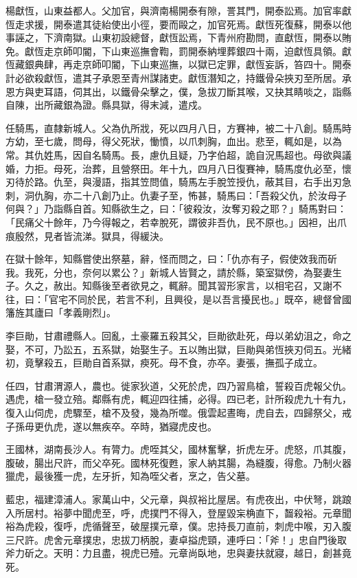 \begin{pinyinscope}
楊獻恆，山東益都人。父加官，與濟南楊開泰有隙，詈其門，開泰訟焉。加官率獻恆走求援，開泰遣其徒紿使出小徑，要而毆之，加官死焉。獻恆死復蘇，開泰以他事誣之，下濟南獄。山東初設總督，獻恆訟焉，下青州府勘問，直獻恆，開泰以賄免。獻恆走京師叩閽，下山東巡撫會鞫，罰開泰納埋葬銀四十兩，迫獻恆具領。獻恆藏銀典肆，再走京師叩閽，下山東巡撫，以獄已定罪，獻恆妄訴，笞四十。開泰計必欲殺獻恆，遣其子承恩至青州謀諸吏。獻恆潛知之，持鐵骨朵挾刃至所居。承恩方與吏耳語，伺其出，以鐵骨朵擊之，僕，急拔刀斷其喉，又抉其睛啖之，詣縣自陳，出所藏銀為證。縣具獄，得末減，遣戍。

任騎馬，直隸新城人。父為仇所戕，死以四月八日，方賽神，被二十八創。騎馬時方幼，至七歲，問母，得父死狀，慟憤，以爪刺胸，血出。悲至，輒如是，以為常。其仇姓馬，因自名騎馬。長，慮仇且疑，乃字伯超，詭自況馬超也。母欲與議婚，力拒。母死，治葬，且營祭田。年十九，四月八日復賽神，騎馬度仇必至，懷刃待於路。仇至，與漫語，指其笠問值，騎馬左手脫笠授仇，蔽其目，右手出刃急刺，洞仇胸，亦二十八創乃止。仇妻子至，怖甚，騎馬曰：「吾殺父仇，於汝母子何與？」乃詣縣自首。知縣欲生之，曰：「彼殺汝，汝奪刃殺之耶？」騎馬對曰：「民痛父十餘年，乃今得報之，若幸脫死，謂彼非吾仇，民不原也。」因袒，出爪痕殷然，見者皆流涕。獄具，得緩決。

在獄十餘年，知縣嘗使出祭墓，辭，怪而問之，曰：「仇亦有子，假使效我而斫我。我死，分也，奈何以累公？」新城人皆賢之，請於縣，築室獄傍，為娶妻生子。久之，赦出。知縣後至者欲見之，輒辭。聞其習形家言，以相宅召，又謝不往，曰：「官宅不同於民，若言不利，且興役，是以吾言擾民也。」既卒，總督曾國籓旌其廬曰「孝義剛烈」。

李巨勛，甘肅禮縣人。回亂，土豪羅五殺其父，巨勛欲赴死，母以弟幼沮之，命之娶，不可，乃訟五，五系獄，始娶生子。五以賄出獄，巨勛與弟恆挾刃伺五。光緒初，竟擊殺五，巨勛自首系獄，瘐死。母不食，亦卒。妻張，撫孤子成立。

任四，甘肅渭源人，農也。徙家狄道，父死於虎，四乃習鳥槍，誓殺百虎報父仇。遇虎，槍一發立殕。鄰縣有虎，輒迎四往捕，必得。四已老，計所殺虎九十有九，復入山伺虎，虎驟至，槍不及發，幾為所噬。俄雲起晝晦，虎自去，四歸祭父，戒子孫毋更仇虎，遂以無疾卒。卒時，猶寢虎皮也。

王國林，湖南長沙人。有膂力。虎咥其父，國林奮擊，折虎左牙。虎怒，爪其腹，腹破，腸出尺許，而父卒死。國林死復甦，家人納其腸，為縫腹，得愈。乃制火器獵虎，最後獲一虎，左牙折，知為咥父者，烹之，告父墓。

藍忠，福建漳浦人。家萬山中，父元章，與叔裕比屋居。有虎夜出，中伏弩，跳踉入所居村。裕夢中聞虎至，呼，虎撲門不得入，登屋毀杗桷直下，齧殺裕。元章聞裕為虎殺，復呼，虎循聲至，破屋撲元章，僕。忠持長刀直前，刺虎中喉，刃入腹三尺許。虎舍元章撲忠，忠拔刀柄脫，妻卓搤虎頸，連呼曰：「斧！」忠自門後取斧力斫之。天明：力且盡，視虎已殪。元章尚臥地，忠與妻扶就寢，越日，創甚竟死。


\end{pinyinscope}